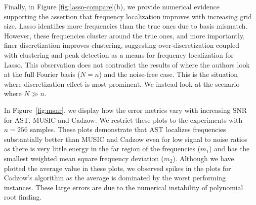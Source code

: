 Finally, in Figure \ref{fig:lasso-compare}(b), we provide numerical evidence
supporting the assertion that frequency localization improves with increasing
grid size. Lasso identifies more frequencies than the true ones due to basis
mismatch. However, these frequencies cluster around the true ones, and more
importantly, finer discretization improves clustering, suggesting
over-discretization coupled with clustering and peak detection as a means for
frequency localization for Lasso. This observation does not contradict the
results of \cite{cpsc} where the authors look at the full Fourier basis ($N=n$)
and the noise-free case. This is the situation where discretization effect is
most prominent. We instead look at the scenario where $N \gg n$.

In Figure~\ref{fig:msnr}, we display how the error metrics vary with
increasing SNR for AST, MUSIC and Cadzow.  We restrict these plots to the experiments with $n =
256$ samples. These plots demonstrate that AST localizes frequencies
substantially better than MUSIC and Cadzow even for low signal to noise ratios
as there is very little energy in the far region of the frequencies ($m_1$) and
has the smallest weighted mean square frequency deviation ($m_2$). Although we
have plotted the average value in these plots, we observed spikes in the plots
for Cadzow's algorithm as the average is dominated by the worst performing
instances.  These large errors are due to the numerical instability of polynomial root finding. 

